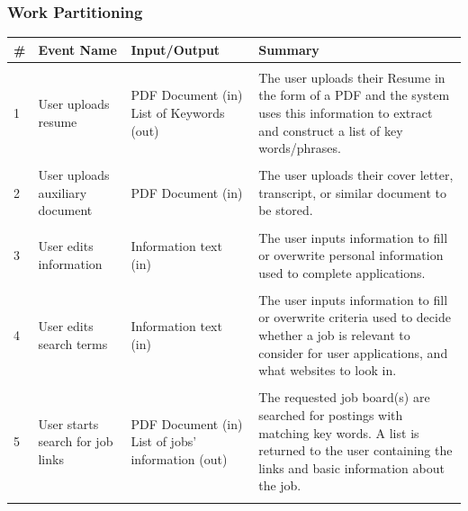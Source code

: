 \documentclass[12pt, titlepage]{article}
\begin{document}
\FloatBarrier

\begin{table}[ht]
\subsubsection{Work Partitioning}
\centering
    \begin{tabular}{|P{0.2in}|P{1.1in}|P{1.8in}|P{2.2in}|}
    \hline
    \textbf{\#} & \textbf{Event Name} & \textbf{Input/Output} & \textbf{Summary}\\ 
    
    \hline
    
    & & & \\
    
    1 
    & User uploads resume 
    & PDF Document (in) \hspace{2in} List of Keywords (out)
    & The user uploads their Resume in the form of a PDF and the system uses this information to extract and construct a list of key words/phrases. \\
    
    & & & \\
    
    2 
    & User uploads auxiliary document 
    & PDF Document (in)
    & The user uploads their cover letter, transcript, or similar document to be stored. \\
    
    & & & \\
    
    3
    & User edits information
    & Information text (in) 
    & The user inputs information to fill or overwrite personal information used to complete applications. \\
    
    & & & \\
    
    4
    & User edits search terms
    & Information text (in)
    & The user inputs information to fill or overwrite criteria used to decide whether a job is relevant to consider for user applications, and what websites to look in. \\
    
    & & & \\
    
    5
    & User starts search for job links 
    & PDF Document (in) \hspace{2in} List of jobs' information (out)
    & The requested job board(s) are searched for postings with matching key words. A list is returned to the user containing the links and basic information about the job. \\
    
    & & & \\
    
    \hline
    \end{tabular}
\end{table}
\end{document}
